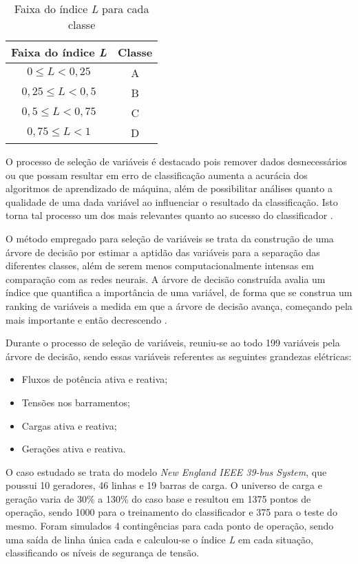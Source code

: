 \documentclass[12pt,oneside,a4paper,chapter=TITLE,section=TITLE,sumario=tradicional,english,brazil]{abntex2}
\begin{document}
	\begin{table}[h]
	\centering
	\caption{Faixa do índice \textit{L} para cada classe}\par 
	\begin{tabular}{c|c} 
	\textbf{Faixa do índice \textit{L}}&\textbf{Classe}\\
 	\hline
 	$0\leq L<0,25$ & A\\
 	$0,25\leq L<0,5$ & B\\
 	$0,5\leq L<0,75$ & C\\
 	$0,75\leq L<1$ & D\\
	\end{tabular}
	\end{table}
	\par
	O processo de seleção de variáveis é destacado pois remover dados desnecessários ou que possam resultar em erro de classificação aumenta a acurácia dos algoritmos de aprendizado de máquina, além de possibilitar análises quanto a qualidade de uma dada variável ao influenciar o resultado da classificação. Isto torna tal processo um dos mais relevantes quanto ao sucesso do classificador \cites{yang1998}{guyon2003}{jensen2001}.\par
	O método empregado para seleção de variáveis se trata da construção de uma árvore de decisão por estimar a aptidão das variáveis para a separação das diferentes classes, além de serem menos computacionalmente intensas em comparação com as redes neurais. A árvore de decisão construída avalia um índice que quantifica a importância de uma variável, de forma que se construa um ranking de variáveis a medida em que a árvore de decisão avança, começando pela mais importante e então decrescendo \cite{breiman1984}. \par
	Durante o processo de seleção de variáveis, reuniu-se ao todo 199 variáveis pela árvore de decisão, sendo essas variáveis referentes as seguintes grandezas elétricas:\par
	\begin{itemize}
	\item Fluxos de potência ativa e reativa;
	\item Tensões nos barramentos;
	\item Cargas ativa e reativa;
	\item Gerações ativa e reativa.
	\end{itemize}
	\par
	O caso estudado se trata do modelo \textit{New England IEEE 39-bus System}, que poussui 10 geradores, 46 linhas e 19 barras de carga. O universo de carga e geração varia de 30\% a 130\% do caso base e resultou em 1375 pontos de operação, sendo 1000 para o treinamento do classificador e 375 para o teste do mesmo. Foram simulados 4 contingências para cada ponto de operação, sendo uma saída de linha única cada e calculou-se o índice \textit{L} em cada situação, classificando os níveis de segurança de tensão. \par
\end{document}
